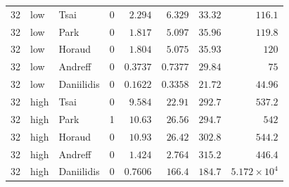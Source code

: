\begin{longtable}{rllrrrrr}
32 & low & Tsai & 0 & $2.294$ & $6.329$ & $33.32$ & $116.1$ \\
32 & low & Park & 0 & $1.817$ & $5.097$ & $35.96$ & $119.8$ \\
32 & low & Horaud & 0 & $1.804$ & $5.075$ & $35.93$ & $120$ \\
32 & low & Andreff & 0 & $0.3737$ & $0.7377$ & $29.84$ & $75$ \\
32 & low & Daniilidis & 0 & $0.1622$ & $0.3358$ & $21.72$ & $44.96$ \\
32 & high & Tsai & 0 & $9.584$ & $22.91$ & $292.7$ & $537.2$ \\
32 & high & Park & 1 & $10.63$ & $26.56$ & $294.7$ & $542$ \\
32 & high & Horaud & 0 & $10.93$ & $26.42$ & $302.8$ & $544.2$ \\
32 & high & Andreff & 0 & $1.424$ & $2.764$ & $315.2$ & $446.4$ \\
32 & high & Daniilidis & 0 & $0.7606$ & $166.4$ & $184.7$ & $5.172\times10^{4}$ \\
\end{longtable}
\endgroup
